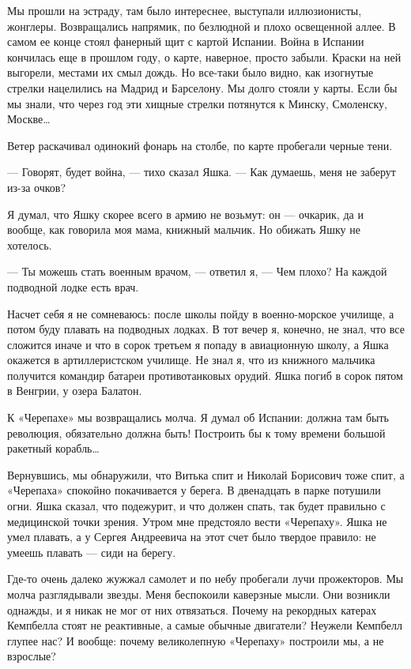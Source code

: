 Мы  прошли  на  эстраду,  там  было  интереснее,  выступали  иллюзионисты,
жонглеры. Возвращались напрямик, по безлюдной и плохо освещенной аллее.  В
самом ее  конце стоял  фанерный  щит с  картой  Испании. Война  в  Испании
кончилась еще в прошлом году, о карте, наверное, просто забыли. Краски  на
ней выгорели, местами их смыл дождь. Но все-таки было видно, как изогнутые
стрелки нацелились на Мадрид и Барселону. Мы долго стояли у карты. Если бы
мы знали, что через год эти хищные стрелки потянутся к Минску,  Смоленску,
Москве…

Ветер раскачивал  одинокий фонарь  на столбе,  по карте  пробегали  черные
тени.

— Говорят, будет война, — тихо сказал Яшка. — Как думаешь, меня не заберут
из-за очков?

Я думал, что  Яшку скорее всего  в армию не  возьмут: он —  очкарик, да  и
вообще, как  говорила  моя  мама,  книжный мальчик.  Но  обижать  Яшку  не
хотелось.

— Ты можешь  стать военным врачом,  — ответил  я, — Чем  плохо? На  каждой
подводной лодке есть врач.

Насчет себя я не сомневаюсь: после школы пойду в военно-морское училище, а
потом буду плавать на  подводных лодках. В тот  вечер я, конечно, не  знал,
что все сложится иначе и что в сорок третьем я попаду в авиационную школу,
а Яшка окажется  в артиллеристском  училище. Не  знал я,  что из  книжного
мальчика получится командир батареи  противотанковых орудий. Яшка погиб  в
сорок пятом в Венгрии, у озера Балатон.

К «Черепахе» мы возвращались  молча. Я думал об  Испании: должна там  быть
революция, обязательно должна  быть! Построить бы  к тому времени  большой
ракетный корабль…

Вернувшись, мы обнаружили, что Витька спит и Николай Борисович тоже  спит,
а «Черепаха» спокойно покачивается у берега. В двенадцать в парке потушили
огни. Яшка сказал, что подежурит, и что должен спать, так будет  правильно
с медицинской точки зрения. Утром мне предстояло вести «Черепаху». Яшка не
умел плавать, а у Сергея Андреевича  на этот счет было твердое правило:  не
умеешь плавать — сиди на берегу.

Где-то очень далеко жужжал самолет  и по небу пробегали лучи  прожекторов.
Мы  молча  разглядывали  звезды.  Меня  беспокоили  каверзные  мысли.  Они
возникли однажды, и я никак не мог от них отвязаться. Почему на  рекордных
катерах Кемпбелла стоят не реактивные, а самые обычные двигатели?  Неужели
Кемпбелл глупее нас?  И вообще: почему  великолепную «Черепаху»  построили
мы, а не взрослые?

